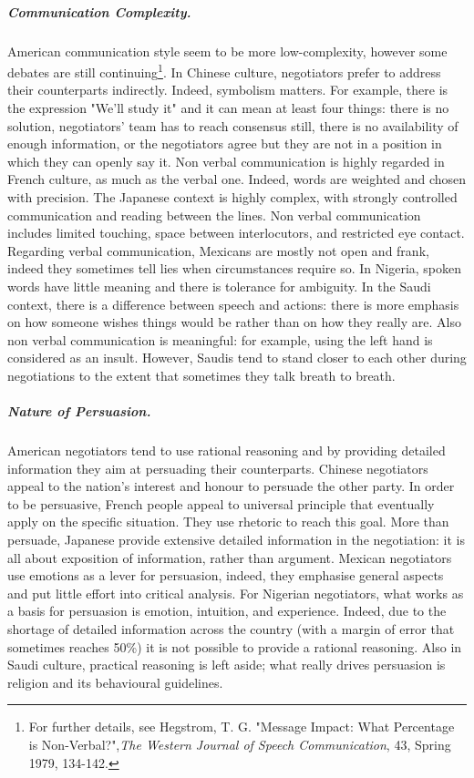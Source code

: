 \documentclass[../main.tex]{subfiles}
\begin{document}
\subparagraph{Communication Complexity.} American communication style seem to be more low-complexity, however some debates are still continuing\footnote{For further details, see Hegstrom, T. G. "Message Impact: What Percentage is Non-Verbal?",\textit{The Western Journal of Speech Communication}, 43, Spring 1979, 134-142.}. In Chinese culture, negotiators prefer to address their counterparts indirectly. Indeed, symbolism matters. For example, there is the expression "We'll study it" and it can mean at least four things: there is no solution, negotiators' team has to reach consensus still, there is no availability of enough information, or the negotiators agree but they are not in a position in which they can openly say it. Non verbal communication is highly regarded in French culture, as much as the verbal one. Indeed, words are weighted and chosen with precision. The Japanese context is highly complex, with strongly controlled communication and reading between the lines. Non verbal communication includes limited touching, space between interlocutors, and restricted eye contact. Regarding verbal communication, Mexicans are mostly not open and frank, indeed they sometimes tell lies when circumstances require so. In Nigeria, spoken words have little meaning and there is tolerance for ambiguity. In the Saudi context, there is a difference between speech and actions: there is more emphasis on how someone wishes things would be rather than on how they really are. Also non verbal communication is meaningful: for example, using the left hand is considered as an insult. However, Saudis tend to stand closer to each other during negotiations to the extent that sometimes they talk breath to breath.

\subparagraph{Nature of Persuasion.} American negotiators tend to use rational reasoning and by providing detailed information they aim at persuading their counterparts. Chinese negotiators appeal to the nation's interest and honour to persuade the other party. In order to be persuasive, French people appeal to universal principle that eventually apply on the specific situation. They use rhetoric to reach this goal. More than persuade, Japanese provide extensive detailed information in the negotiation: it is all about exposition of information, rather than argument. Mexican negotiators use emotions as a lever for persuasion, indeed, they emphasise general aspects and put little effort into critical analysis. For Nigerian negotiators, what works as a basis for persuasion is emotion, intuition, and experience. Indeed, due to the shortage of detailed information across the country (with a margin of error that sometimes reaches 50\%) it is not possible to provide a rational reasoning. Also in Saudi culture, practical reasoning is left aside; what really drives persuasion is religion and its behavioural guidelines.
\end{document}

